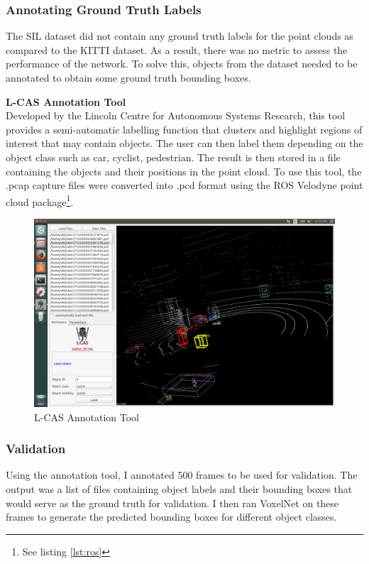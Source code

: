 \subsubsection*{Annotating Ground Truth Labels}
The SIL dataset did not contain any ground truth labels for the point clouds as compared to the KITTI dataset. As a result, there was no metric to assess the performance of the network. To solve this, objects from the dataset needed to be annotated to obtain some ground truth bounding boxes. 

\noindent
\textbf{L-CAS Annotation Tool} \\ 
Developed by the Lincoln Centre for Autonomous Systems Research, this tool provides a semi-automatic labelling function that clusters and highlight regions of interest that may contain objects\cite{yz17iros}. The user can then label them depending on the object class such as car, cyclist, pedestrian. The result is then stored in a file containing the objects and their positions in the point cloud. 
To use this tool, the .pcap capture files were converted into .pcd format using the 
ROS Velodyne point cloud package\footnote{See listing \ref{lst:ros}}. 

\begin{figure}[h]
	
	\includegraphics[width=\linewidth]{images/annot.png}
	\caption{L-CAS Annotation Tool}
	\label{fig:annot}
\end{figure}

\subsubsection{Validation}
Using the annotation tool, I annotated 500 frames to be used for validation. The output was a list of files containing object labels and their bounding boxes that would serve as the ground truth for validation. 
I then  ran VoxelNet on these frames to generate the predicted bounding boxes for different object classes.  



